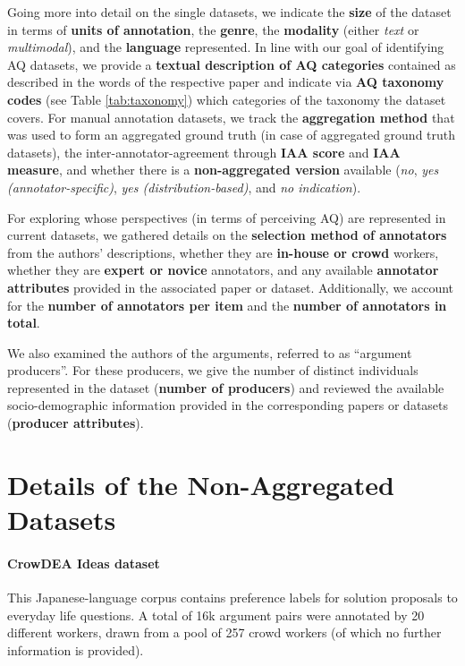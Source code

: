 Going more into detail on the single datasets, we indicate the \textbf{size} of the dataset in terms of \textbf{units of annotation}, the \textbf{genre}, the \textbf{modality} (either \textit{text} or \textit{multimodal}), and the \textbf{language} represented.
In line with our goal of identifying AQ datasets, we provide a \textbf{textual description of AQ categories} contained as described in the words of the respective paper and indicate via \textbf{AQ taxonomy codes} (see Table \ref{tab:taxonomy}) which categories of the taxonomy the dataset covers.
For manual annotation datasets, we track the \textbf{aggregation method} that was used to form an aggregated ground truth (in case of aggregated ground truth datasets), the inter-annotator-agreement through \textbf{IAA score} and \textbf{IAA measure}, and whether there is a \textbf{non-aggregated version} available (\textit{no}, \textit{yes (annotator-specific)}, \textit{yes (distribution-based)}, and \textit{no indication}).

For exploring whose perspectives (in terms of perceiving AQ) are represented in current datasets, we gathered details on the \textbf{selection method of annotators} from the authors' descriptions, whether they are \textbf{in-house or crowd} workers, whether they are \textbf{expert or novice} annotators, and any available \textbf{annotator attributes} provided in the associated paper or dataset. Additionally, we account for the \textbf{number of annotators per item} and the \textbf{number of annotators in total}.

We also examined the authors of the arguments, referred to as ``argument producers''. For these producers, we give the number of distinct individuals represented in the dataset (\textbf{number of producers}) and reviewed the available socio-demographic information provided in the corresponding papers or datasets (\textbf{producer attributes}).


\section{Details of the Non-Aggregated Datasets}
\label{sec:description-non-aggr-datasets}

\paragraph{CrowDEA Ideas dataset \cite{Baba_Li_Kashima_2020}}
This Japanese-language corpus contains preference labels for solution proposals to everyday life questions. A total of 16k argument pairs were annotated by 20 different workers, drawn from a pool of 257 crowd workers (of which no further information is provided).

